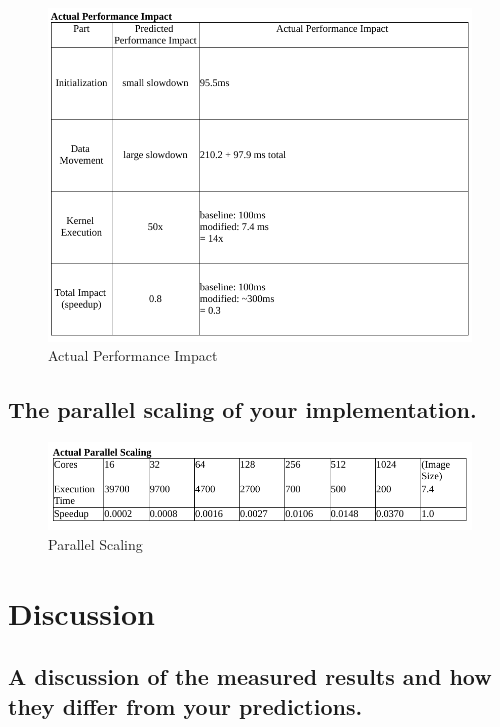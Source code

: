 \documentclass{article}
\begin{document}
\begin{figure}[h!t]
    \centering
    \includegraphics[width=1\textwidth]{actual.png}
    \caption{Actual Performance Impact}
    \label{fig:actual}
\end{figure}

\subsection{The parallel scaling of your implementation.}

\begin{figure}[h!t]
    \centering
    \includegraphics[width=1\textwidth]{parallel.png}
    \caption{Parallel Scaling}
    \label{fig:parallel}
\end{figure}

\section{Discussion}

\subsection{A discussion of the measured results and how they differ from your predictions.}
\end{document}
